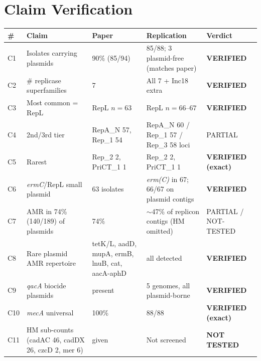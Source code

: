\documentclass[11pt]{article}
\begin{document}
\section{Claim Verification}

\begin{center}
\small
\begin{longtable}{@{}p{0.4cm}p{4.3cm}p{2.6cm}p{4.6cm}p{2.1cm}@{}}
\toprule
\# & Claim & Paper & Replication & Verdict \\
\midrule \endhead
C1  & Isolates carrying plasmids            & 90\% (85/94)         & 85/88; 3 plasmid-free (matches paper)         & \textbf{VERIFIED} \\
C2  & \# replicase superfamilies             & 7                    & All 7 + Inc18 extra                            & \textbf{VERIFIED} \\
C3  & Most common = RepL                     & RepL $n{=}63$        & RepL $n{=}66$--$67$                            & \textbf{VERIFIED} \\
C4  & 2nd/3rd tier                           & RepA\_N 57, Rep\_1 54 & RepA\_N 60 / Rep\_1 57 / Rep\_3 58 loci        & PARTIAL \\
C5  & Rarest                                 & Rep\_2 2, PriCT\_1 1 & Rep\_2 2, PriCT\_1 1                           & \textbf{VERIFIED (exact)} \\
C6  & \emph{ermC}/RepL small plasmid         & 63 isolates          & \emph{erm(C)} in 67; 66/67 on plasmid contigs & \textbf{VERIFIED} \\
C7  & AMR in 74\% (140/189) of plasmids      & 74\%                 & $\sim$47\% of replicon contigs (HM omitted)   & PARTIAL / NOT-TESTED \\
C8  & Rare plasmid AMR repertoire            & tetK/L, aadD, mupA, ermB, lnuB, cat, aacA-aphD & all detected                       & \textbf{VERIFIED} \\
C9  & \emph{qacA} biocide plasmids           & present              & 5 genomes, all plasmid-borne                   & \textbf{VERIFIED} \\
C10 & \emph{mecA} universal                  & 100\%                & 88/88                                          & \textbf{VERIFIED (exact)} \\
C11 & HM sub-counts (cadAC 46, cadDX 26, czcD 2, mer 6) & given     & Not screened                                   & \textbf{NOT TESTED} \\
\bottomrule
\end{longtable}
\end{center}
\end{document}
